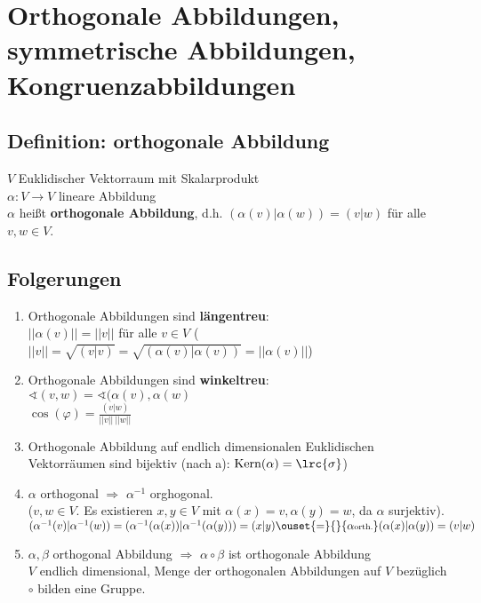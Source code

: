 \chapter{Orthogonale Abbildungen, symmetrische Abbildungen, Kongruenzabbildungen}

\section{Definition: orthogonale Abbildung}
	$ V $ Euklidischer Vektorraum mit Skalarprodukt\\
	$ \alpha:V\rightarrow V $ lineare Abbildung\\
	$ \alpha $ heißt \textbf{orthogonale Abbildung}, d.h. $ (\alpha(v)|\alpha(w))=(v|w) $ für alle $ v,w\in V $.
	
\section{Folgerungen}
	\begin{enumerate}
		\item Orthogonale Abbildungen sind \textbf{längentreu}:\\
		$ ||\alpha(v)||=||v|| $ für alle $ v\in V $
		($ ||v||=\sqrt{(v|v)}=\sqrt{(\alpha(v)|\alpha(v))}=||\alpha(v)|| $)
		\item  Orthogonale Abbildungen sind \textbf{winkeltreu}:\\
		$\sphericalangle(v,w)=\sphericalangle(\alpha(v),\alpha(w)$\\
		$ \cos(\varphi)=\frac{(v|w)}{||v||\ ||w|| } $
		\item Orthogonale Abbildung auf endlich dimensionalen Euklidischen Vektorräumen sind bijektiv (nach a): $ \mbox{Kern}(\alpha)=\lrc{\sigma} $)
		\item  $ \alpha $ orthogonal $ \Rightarrow $ $ \alpha^{-1} $ orghogonal.\\
		($ v,w\in V $. Es existieren $ x,y\in V $ mit $ \alpha(x)=v,\alpha(y)=w $, da $ \alpha $ surjektiv).\\
		$( \alpha^{-1}(v)|\alpha^{-1}(w) )= (\alpha^{-1}(\alpha(x))|\alpha^{-1}(\alpha(y)))=(x|y)\ouset{=}{}{\alpha\mbox{\scriptsize orth.}}(\alpha(x)|\alpha(y))=(v|w) $
		\item  $ \alpha,\beta $ orthogonal Abbildung $ \Rightarrow $ $ \alpha\circ\beta $ ist orthogonale Abbildung\\
		$ V $ endlich dimensional, Menge der orthogonalen Abbildungen auf $ V $ bezüglich $ \circ $ bilden eine Gruppe.
	\end{enumerate}

